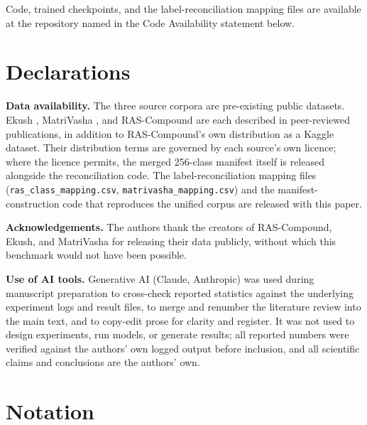 Code, trained checkpoints, and the label-reconciliation mapping files
are available at the repository named in the Code Availability statement
below.


\hypertarget{declarations}{%
\section{Declarations}\label{declarations}}

\textbf{Data availability.} The three source corpora are pre-existing
public datasets. Ekush \citep{ref29}, MatriVasha \citep{ref49}, and
RAS-Compound \citep{ref50} are each described in peer-reviewed
publications, in addition to RAS-Compound's own distribution as a
Kaggle dataset. Their distribution terms are governed by each source's
own licence; where the licence permits, the merged 256-class manifest
itself is released alongside the reconciliation code. The
label-reconciliation mapping files (\texttt{ras\_class\_mapping.csv},
\texttt{matrivasha\_mapping.csv}) and the manifest-construction code
that reproduces the unified corpus are released with this paper.

\textbf{Acknowledgements.} The authors thank the creators of
RAS-Compound, Ekush, and MatriVasha for releasing their data publicly,
without which this benchmark would not have been possible.

\textbf{Use of AI tools.} Generative AI (Claude, Anthropic) was used
during manuscript preparation to cross-check reported statistics against
the underlying experiment logs and result files, to merge and renumber
the literature review into the main text, and to copy-edit prose for
clarity and register. It was not used to design experiments, run models,
or generate results; all reported numbers were verified against the
authors' own logged output before inclusion, and all scientific claims
and conclusions are the authors' own.


\appendix
\hypertarget{appendix-a.-notation}{%
\section{Notation}\label{appendix-a.-notation}}

